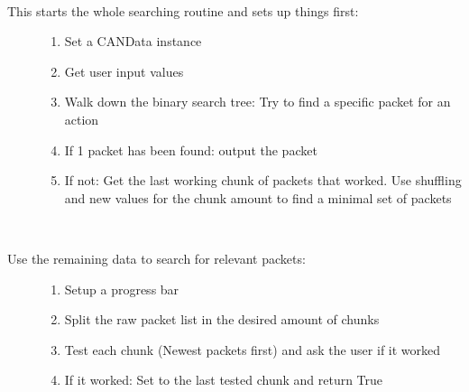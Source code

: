\documentclass[letterpaper,10pt,english]{sphinxmanual}
\begin{document}
\begin{fulllineitems}

\begin{fulllineitems}
\label{\detokenize{src:src.SearcherTab.SearcherTab.searchPackets}}~\begin{description}
\item[{This starts the whole searching routine and sets up things first:}] \leavevmode\begin{enumerate}
\item {} 
Set a CANData instance

\item {} 
Get user input values

\item {} 
Walk down the binary search tree: Try to find a specific packet for an action

\item {} 
If 1 packet has been found: output the packet

\item {} 
If not: Get the last working chunk of packets that worked.
Use shuffling and new values for the chunk amount to find a minimal set of packets

\end{enumerate}

\end{description}

\end{fulllineitems}


\begin{fulllineitems}
\label{\detokenize{src:src.SearcherTab.SearcherTab.sendAndSearch}}~\begin{description}
\item[{Use the remaining data to search for relevant packets:}] \leavevmode\begin{enumerate}
\item {} 
Setup a progress bar

\item {} 
Split the raw packet list in the desired amount of chunks

\item {} 
Test each chunk (Newest packets first) and ask the user if it worked

\item {} 
If it worked: Set  to the last tested chunk and return True


\end{enumerate}
\end{description}
\end{fulllineitems}
\end{fulllineitems}
\end{document}
